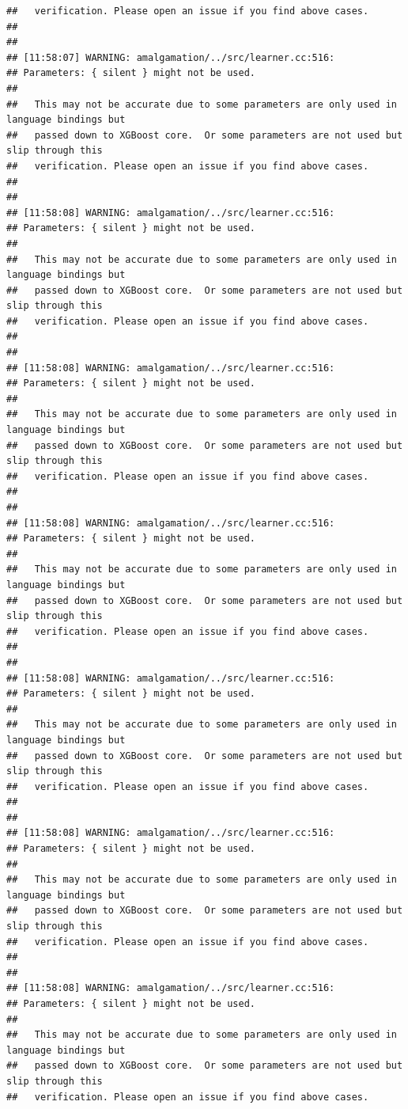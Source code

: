 \documentclass[AMS,STIX2COL]{WileyNJD-v2}\usepackage[]{graphicx}\usepackage[]{color}
\makeatletter
\newenvironment{kframe}{%
 \def\at@end@of@kframe{}%
 \ifinner\ifhmode%
  \def\at@end@of@kframe{\end{minipage}}%
  \begin{minipage}{\columnwidth}%
 \fi\fi%
 \def\FrameCommand##1{\hskip\@totalleftmargin \hskip-\fboxsep
 \colorbox{shadecolor}{##1}\hskip-\fboxsep
     \hskip-\linewidth \hskip-\@totalleftmargin \hskip\columnwidth}%
 \MakeFramed {\advance\hsize-\width
   \@totalleftmargin\z@ \linewidth\hsize
   \@setminipage}}%
 {\par\unskip\endMakeFramed%
 \at@end@of@kframe}
\newenvironment{knitrout}{}{} %
\makeatother
\begin{document}
\begin{knitrout}
\begin{kframe}
\begin{verbatim}
##   verification. Please open an issue if you find above cases.
## 
## 
## [11:58:07] WARNING: amalgamation/../src/learner.cc:516: 
## Parameters: { silent } might not be used.
## 
##   This may not be accurate due to some parameters are only used in language bindings but
##   passed down to XGBoost core.  Or some parameters are not used but slip through this
##   verification. Please open an issue if you find above cases.
## 
## 
## [11:58:08] WARNING: amalgamation/../src/learner.cc:516: 
## Parameters: { silent } might not be used.
## 
##   This may not be accurate due to some parameters are only used in language bindings but
##   passed down to XGBoost core.  Or some parameters are not used but slip through this
##   verification. Please open an issue if you find above cases.
## 
## 
## [11:58:08] WARNING: amalgamation/../src/learner.cc:516: 
## Parameters: { silent } might not be used.
## 
##   This may not be accurate due to some parameters are only used in language bindings but
##   passed down to XGBoost core.  Or some parameters are not used but slip through this
##   verification. Please open an issue if you find above cases.
## 
## 
## [11:58:08] WARNING: amalgamation/../src/learner.cc:516: 
## Parameters: { silent } might not be used.
## 
##   This may not be accurate due to some parameters are only used in language bindings but
##   passed down to XGBoost core.  Or some parameters are not used but slip through this
##   verification. Please open an issue if you find above cases.
## 
## 
## [11:58:08] WARNING: amalgamation/../src/learner.cc:516: 
## Parameters: { silent } might not be used.
## 
##   This may not be accurate due to some parameters are only used in language bindings but
##   passed down to XGBoost core.  Or some parameters are not used but slip through this
##   verification. Please open an issue if you find above cases.
## 
## 
## [11:58:08] WARNING: amalgamation/../src/learner.cc:516: 
## Parameters: { silent } might not be used.
## 
##   This may not be accurate due to some parameters are only used in language bindings but
##   passed down to XGBoost core.  Or some parameters are not used but slip through this
##   verification. Please open an issue if you find above cases.
## 
## 
## [11:58:08] WARNING: amalgamation/../src/learner.cc:516: 
## Parameters: { silent } might not be used.
## 
##   This may not be accurate due to some parameters are only used in language bindings but
##   passed down to XGBoost core.  Or some parameters are not used but slip through this
##   verification. Please open an issue if you find above cases.

\end{verbatim}
\end{kframe}
\end{knitrout}
\end{document}
